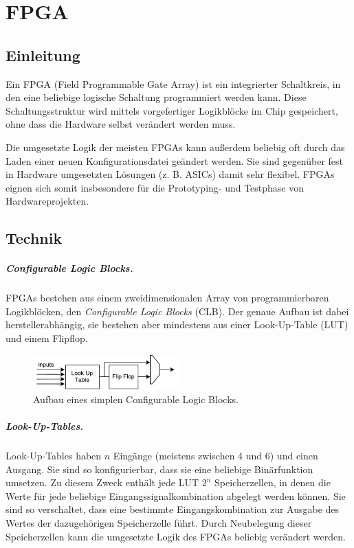 \chapter{FPGA} %
\label{FPGA} %

\section{Einleitung}
Ein FPGA (Field Programmable Gate Array) ist ein integrierter Schaltkreis, in den eine beliebige logische Schaltung programmiert werden kann. Diese Schaltungsstruktur wird mittels vorgefertiger Logikblöcke im Chip gespeichert, ohne dass die Hardware selbst verändert werden muss.

Die umgesetzte Logik der meisten FPGAs kann außerdem beliebig oft durch
das Laden einer neuen Konfigurationsdatei geändert werden. Sie sind
gegenüber fest in Hardware umgesetzten Lösungen (z. B. ASICs) damit sehr
flexibel. FPGAs eignen sich somit insbesondere für die Prototyping- und
Testphase von Hardwareprojekten.~\cite[S. 8]{SynthesisFPGA}

\section{Technik}
\paragraph{Configurable Logic Blocks.} FPGAs bestehen aus einem zweidimensionalen Array von programmierbaren Logikblöcken, den \emph{Configurable Logic Blocks} (CLB). \cite[S. 11]{Chu} Der genaue Aufbau ist dabei herstellerabhängig, sie bestehen aber mindestens aus einer Look-Up-Table (LUT) und einem Flipflop. \cite[S. 8]{SynthesisFPGA}

\begin{figure} [ht]
  \centering
  \includegraphics[width=0.5\textwidth]{Figures/clb}
  \caption{Aufbau eines simplen Configurable Logic Blocks.}
  \label{fig:clb}
\end{figure}

\paragraph{Look-Up-Tables.} Look-Up-Tables haben $n$ Eingänge (meistens zwischen 4 und 6) und einen Ausgang. Sie sind so konfigurierbar, dass sie eine beliebige Binärfunktion umsetzen. Zu diesem Zweck enthält jede LUT $2^n$ Speicherzellen, in denen die Werte für jede beliebige Eingangssignalkombination abgelegt werden können. Sie sind so verschaltet, dass eine bestimmte Eingangskombination zur Ausgabe des Wertes der dazugehörigen Speicherzelle führt. \cite[S. 12f.]{Chu} Durch Neubelegung dieser Speicherzellen kann die umgesetzte Logik des FPGAs beliebig verändert werden.

